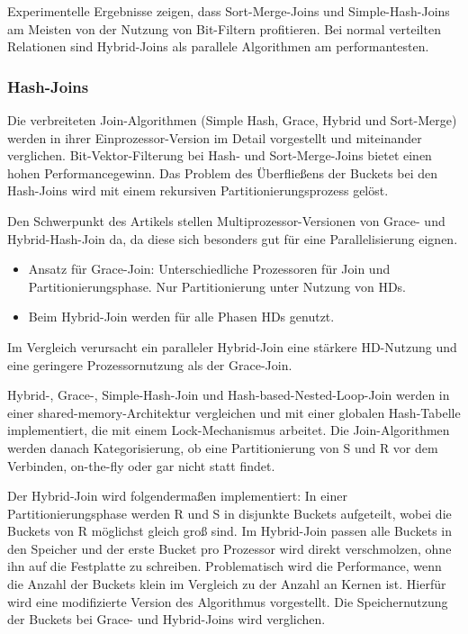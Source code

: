 \documentclass[a4paper,12pt,twoside]{article}
\begin{document}
Experimentelle Ergebnisse zeigen, dass Sort-Merge-Joins und Simple-Hash-Joins am Meisten von der Nutzung von Bit-Filtern profitieren. Bei normal verteilten Relationen sind Hybrid-Joins als parallele Algorithmen am performantesten. 

\subsubsection{Hash-Joins}

\textbf{}

Die verbreiteten Join-Algorithmen (Simple Hash, Grace, Hybrid und Sort-Merge) werden in ihrer Einprozessor-Version im Detail vorgestellt und miteinander verglichen. Bit-Vektor-Filterung bei Hash- und Sort-Merge-Joins bietet einen hohen Performancegewinn. Das Problem des Überfließens der Buckets bei den Hash-Joins wird mit einem rekursiven Partitionierungsprozess gelöst. 

Den Schwerpunkt des Artikels stellen Multiprozessor-Versionen von Grace- und Hybrid-Hash-Join da, da diese sich besonders gut für eine Parallelisierung eignen.

\begin{itemize}
	\item Ansatz für Grace-Join: Unterschiedliche Prozessoren für Join und Partitionierungsphase. Nur Partitionierung unter Nutzung von HDs.
	\item Beim Hybrid-Join werden für alle Phasen HDs genutzt.
\end{itemize}

Im Vergleich verursacht ein paralleler Hybrid-Join eine stärkere HD-Nutzung und eine geringere Prozessornutzung als der Grace-Join.

\textbf{}

Hybrid-, Grace-, Simple-Hash-Join und Hash-based-Nested-Loop-Join werden in einer shared-memory-Architektur vergleichen und mit einer globalen Hash-Tabelle implementiert, die mit einem Lock-Mechanismus arbeitet. Die Join-Algorithmen werden danach Kategorisierung, ob eine Partitionierung von S und R vor dem Verbinden, on-the-fly oder gar nicht statt findet. 

Der Hybrid-Join wird folgendermaßen implementiert: In einer Partitionierungsphase werden R und S in disjunkte Buckets aufgeteilt, wobei die Buckets von R möglichst gleich groß sind. Im Hybrid-Join passen alle Buckets in den Speicher und der erste Bucket pro Prozessor wird direkt verschmolzen, ohne ihn auf die Festplatte zu schreiben. Problematisch wird die Performance, wenn die Anzahl der Buckets klein im Vergleich zu der Anzahl an Kernen ist. Hierfür wird eine modifizierte Version des Algorithmus vorgestellt. Die Speichernutzung der Buckets bei Grace- und Hybrid-Joins wird verglichen.
\end{document}
